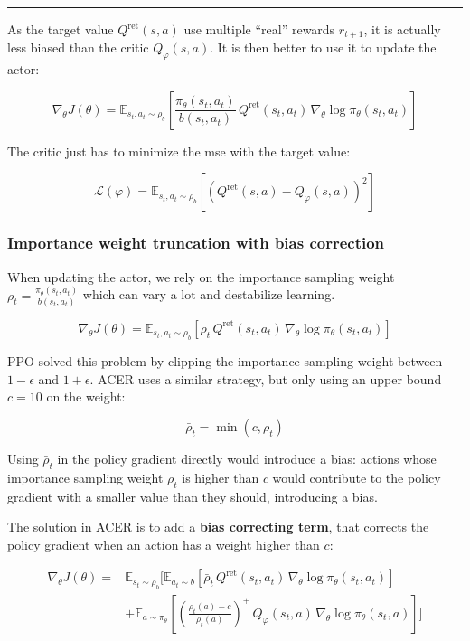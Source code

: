 \documentclass[
  letterpaper,
  DIV=11,
  numbers=noendperiod]{scrreprt}
\begin{document}
\begin{center}\rule{0.5\linewidth}{0.5pt}\end{center}

As the target value \(Q^\text{ret}(s, a)\) use multiple ``real'' rewards
\(r_{t+1}\), it is actually less biased than the critic
\(Q_\varphi(s, a)\). It is then better to use it to update the actor:

\[
    \nabla_\theta J(\theta)  = \mathbb{E}_{s_t, a_t \sim \rho_b} [\frac{\pi_\theta(s_t, a_t)}{b(s_t, a_t)} \, Q^\text{ret}(s_t, a_t) \, \nabla_\theta \log \pi_\theta(s_t, a_t)]
\]

The critic just has to minimize the mse with the target value:

\[
    \mathcal{L}(\varphi) = \mathbb{E}_{s_t, a_t \sim \rho_b} [(Q^\text{ret}(s, a) - Q_\varphi(s, a))^2]
\]

\hypertarget{importance-weight-truncation-with-bias-correction}{%
\subsubsection*{Importance weight truncation with bias
correction}\label{importance-weight-truncation-with-bias-correction}}

When updating the actor, we rely on the importance sampling weight
\(\rho_t = \frac{\pi_\theta(s_t, a_t)}{b(s_t, a_t)}\) which can vary a
lot and destabilize learning.

\[
    \nabla_\theta J(\theta)  = \mathbb{E}_{s_t, a_t \sim \rho_b} [\rho_t \, Q^\text{ret}(s_t, a_t) \, \nabla_\theta \log \pi_\theta(s_t, a_t)]
\]

PPO solved this problem by clipping the importance sampling weight
between \(1- \epsilon\) and \(1+\epsilon\). ACER uses a similar
strategy, but only using an upper bound \(c = 10\) on the weight:

\[
    \bar{\rho}_t = \min(c, \rho_t)
\]

Using \(\bar{\rho}_t\) in the policy gradient directly would introduce a
bias: actions whose importance sampling weight \(\rho_t\) is higher than
\(c\) would contribute to the policy gradient with a smaller value than
they should, introducing a bias.

The solution in ACER is to add a \textbf{bias correcting term}, that
corrects the policy gradient when an action has a weight higher than
\(c\):

\[
\begin{aligned}
    \nabla_\theta J(\theta)  = & \mathbb{E}_{s_t \sim \rho_b} [\mathbb{E}_{a_t \sim b} [\bar{\rho}_t \, Q^\text{ret}(s_t, a_t) \, \nabla_\theta \log \pi_\theta(s_t, a_t)] \\
    & + \mathbb{E}_{a \sim \pi_\theta}[(\frac{\rho_t(a) - c}{\rho_t(a)})^+ \, Q_\varphi(s_t, a) \, \nabla_\theta \log \pi_\theta(s_t, a)]] \\
\end{aligned}
\]
\end{document}
